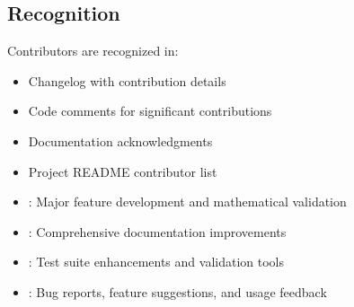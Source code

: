\documentclass[letterpaper,10pt,english]{sphinxmanual}
\begin{document}
\sphinxAtStartPar
{}

\begin{sphinxVerbatim}[commandchars=\\\{\}]

\end{sphinxVerbatim}


\subsection{Recognition}
\label{\detokenize{contributing:recognition}}
\sphinxAtStartPar
Contributors are recognized in:
\begin{itemize}
\item {} 
\sphinxAtStartPar
Changelog with contribution details

\item {} 
\sphinxAtStartPar
Code comments for significant contributions

\item {} 
\sphinxAtStartPar
Documentation acknowledgments

\item {} 
\sphinxAtStartPar
Project README contributor list

\end{itemize}

\sphinxAtStartPar
{}
\begin{itemize}
\item {} 
\sphinxAtStartPar
{}: Major feature development and mathematical validation

\item {} 
\sphinxAtStartPar
{}: Comprehensive documentation improvements

\item {} 
\sphinxAtStartPar
{}: Test suite enhancements and validation tools

\item {} 
\sphinxAtStartPar
{}: Bug reports, feature suggestions, and usage feedback

\end{itemize}
\end{document}
